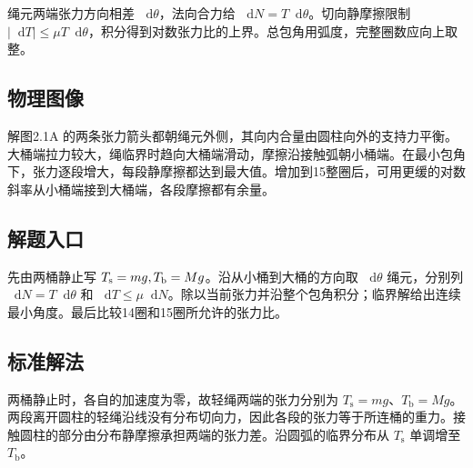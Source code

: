 \documentclass[UTF8,fontset=fandol,a4paper,11pt]{ctexart}
\newcommand{\dd}{\mathop{}\!\mathrm{d}}
\begin{document}
绳元两端张力方向相差 $\dd\theta$，法向合力给 $\dd N=T\dd\theta$。切向静摩擦限制 $|\dd T|\leq\mu T\dd\theta$，积分得到对数张力比的上界。总包角用弧度，完整圈数应向上取整。




\subsection*{物理图像}

解图2.1A 的两条张力箭头都朝绳元外侧，其向内合量由圆柱向外的支持力平衡。大桶端拉力较大，绳临界时趋向大桶端滑动，摩擦沿接触弧朝小桶端。在最小包角下，张力逐段增大，每段静摩擦都达到最大值。增加到15整圈后，可用更缓的对数斜率从小桶端接到大桶端，各段摩擦都有余量。



\subsection*{解题入口}

先由两桶静止写 $T_{\rm s}=mg,T_{\rm b}=Mg$。沿从小桶到大桶的方向取 $\dd\theta$ 绳元，分别列 $\dd N=T\dd\theta$ 和 $\dd T\leq\mu\dd N$。除以当前张力并沿整个包角积分；临界解给出连续最小角度。最后比较14圈和15圈所允许的张力比。



\subsection*{标准解法}

两桶静止时，各自的加速度为零，故轻绳两端的张力分别为 $T_{\mathrm s}=mg$、$T_{\mathrm b}=Mg$。两段离开圆柱的轻绳沿线没有分布切向力，因此各段的张力等于所连桶的重力。接触圆柱的部分由分布静摩擦承担两端的张力差。沿圆弧的临界分布从 $T_{\mathrm s}$ 单调增至 $T_{\mathrm b}$。
\end{document}
